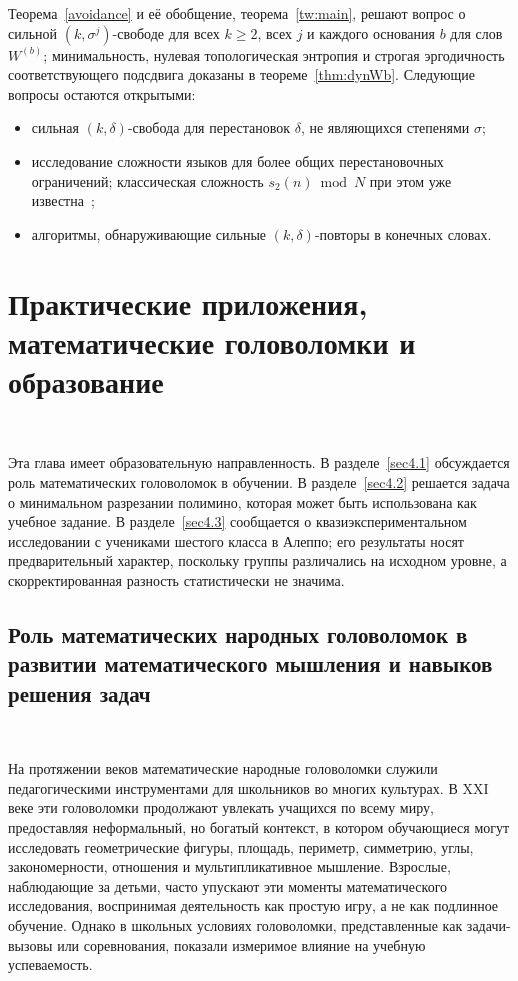 \documentclass[a4paper,14pt]{extreport}
\theoremstyle{plain}
\theoremstyle{definition}
\theoremstyle{remark}
\begin{document}
Теорема~\ref{avoidance} и её обобщение, теорема~\ref{tw:main}, решают вопрос о сильной $(k,\sigma^j)$-свободе для всех $k\ge2$, всех $j$ и каждого основания $b$ для слов $W^{(b)}$; минимальность, нулевая топологическая энтропия и строгая эргодичность соответствующего подсдвига доказаны в теореме~\ref{thm:dynWb}. Следующие вопросы остаются открытыми:
\begin{itemize}
	\item сильная $(k,\delta)$-свобода для перестановок $\delta$, не являющихся степенями $\sigma$;
	\item исследование сложности языков для более общих перестановочных ограничений; классическая сложность $s_2(n)\bmod N$ при этом уже известна~\cite{TrompShallit1995};
	\item алгоритмы, обнаруживающие сильные $(k,\delta)$-повторы в конечных словах.
\end{itemize}
\chapter{Практические приложения, математические головоломки и образование}~\label{sec4}

Эта глава имеет образовательную направленность. В разделе~\ref{sec4.1} обсуждается роль математических головоломок в обучении. В разделе~\ref{sec4.2} решается задача о минимальном разрезании полимино, которая может быть использована как учебное задание. В разделе~\ref{sec4.3} сообщается о квазиэкспериментальном исследовании с учениками шестого класса в Алеппо; его результаты носят предварительный характер, поскольку группы различались на исходном уровне, а скорректированная разность статистически не значима.
\section{Роль математических народных головоломок в развитии математического мышления и навыков решения задач}~\label{sec4.1}

На протяжении веков математические народные головоломки служили педагогическими инструментами для школьников во многих культурах. В XXI веке эти головоломки продолжают увлекать учащихся по всему миру, предоставляя неформальный, но богатый контекст, в котором обучающиеся могут исследовать геометрические фигуры, площадь, периметр, симметрию, углы, закономерности, отношения и мультипликативное мышление. Взрослые, наблюдающие за детьми, часто упускают эти моменты математического исследования, воспринимая деятельность как простую игру, а не как подлинное обучение. Однако в школьных условиях головоломки, представленные как задачи-вызовы или соревнования, показали измеримое влияние на учебную успеваемость.
\end{document}
